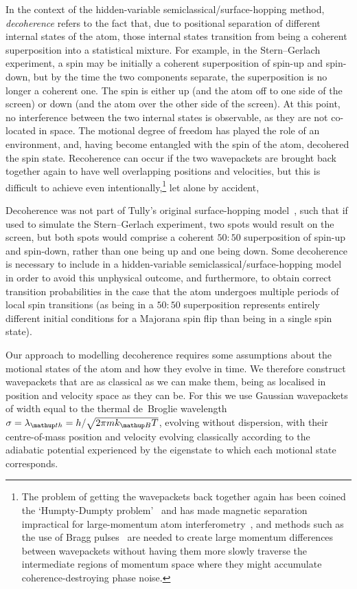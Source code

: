 In the context of the hidden-variable semiclassical/surface-hopping method, \emph{decoherence} refers to the fact that, due to positional separation of different internal states of the atom, those internal states transition from being a coherent superposition into a statistical mixture. For example, in the Stern--Gerlach experiment, a spin may be initially a coherent superposition of spin-up and spin-down, but by the time the two components separate, the superposition is no longer a coherent one. The spin is either up (and the atom off to one side of the screen) or down (and the atom over the other side of the screen). At this point, no interference between the two internal states is observable, as they are not co-located in space. The motional degree of freedom has played the role of an environment, and, having become entangled with the spin of the atom, decohered the spin state. Recoherence can occur if the two wavepackets are brought back together again to have well overlapping positions and velocities, but this is difficult to achieve even intentionally,\footnote{The problem of getting the wavepackets back together again has been coined the `Humpty-Dumpty problem'~\cite{Schwinger1988, doi:10.1063/1.459170} and has made magnetic separation impractical for large-momentum atom interferometry~\cite{machluf_coherent_2013}, and methods such as the use of Bragg pulses~\cite{PhysRevLett.66.2693, PhysRevLett.75.2633} are needed to create large momentum differences between wavepackets without having them more slowly traverse the intermediate regions of momentum space where they might accumulate coherence-destroying phase noise.} let alone by accident, 

Decoherence was not part of Tully's original surface-hopping model~\cite{doi:10.1063/1.459170}, such that if used to simulate the Stern--Gerlach experiment, two spots would result on the screen, but both spots would comprise a coherent $50:50$ superposition of spin-up and spin-down, rather than one being up and one being down. Some decoherence is necessary to include in a hidden-variable semiclassical/surface-hopping model in order to avoid this unphysical outcome, and furthermore, to obtain correct transition probabilities in the case that the atom undergoes multiple periods of local spin transitions (as being in a $50:50$ superposition represents entirely different initial conditions for a Majorana spin flip than being in a single spin state).

Our approach to modelling decoherence requires some assumptions about the motional states of the atom and how they evolve in time. We therefore construct wavepackets that are as classical as we can make them, being as localised in position and velocity space as they can be. For this we use Gaussian wavepackets of width equal to the thermal de~Broglie wavelength $\sigma = \lambda_\up{th} = h/\sqrt{2\pi m k_\up{B} T}$, evolving without dispersion, with their centre-of-mass position and velocity evolving classically according to the adiabatic potential experienced by the eigenstate to which each motional state corresponds.

